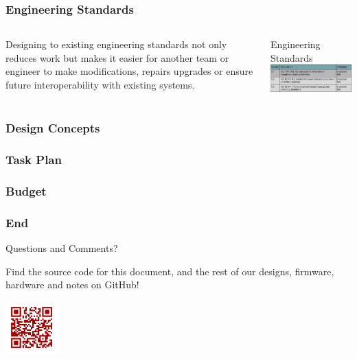 \documentclass[aspectratio=169]{beamer}
\begin{document}
\begin{frame}
    \frametitle{Engineering Standards}

    \begin{columns}
        \begin{column}{0.48\textwidth}
            Designing to existing engineering standards not only reduces work but makes it easier
            for another team or engineer to make modifications, repairs upgrades or ensure future
            interoperability with existing systems.
        \end{column}

        \begin{column}{0.48\textwidth}
            \begin{block}{Engineering Standards}
                \includegraphics[width=7.3cm]{EngineeringStandards}
            \end{block}
        \end{column}
    \end{columns}
\end{frame}

\begin{frame}
    \frametitle{Design Concepts}
\end{frame}

\begin{frame}
    \frametitle{Task Plan}
\end{frame}

\begin{frame}
    \frametitle{Budget}
\end{frame}

\begin{frame}
    \frametitle{End}

    \begin{block}{}
        \begin{center}
            \Huge Questions and Comments?
        \end{center}
    \end{block}

    \begin{center}
        Find the source code for this document, and the rest of our designs, firmware, hardware
        and notes on GitHub!

        \includegraphics[height=2cm]{github_qr}
    \end{center}

\end{frame}
\end{document}

